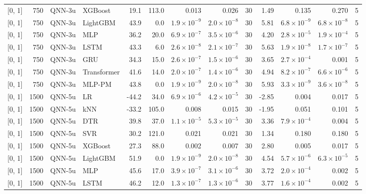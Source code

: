 \begin{longtable}{lrllrrrrrrrrr}
{[0, 1]} & 750 & QNN-3u & XGBoost & 19.1 & 113.0 & 0.013 & 0.026 & 30 & 1.49 & 0.135 & 0.270 & 5 \\
{[0, 1]} & 750 & QNN-3u & LightGBM & 43.9 & 0.0 & $1.9 \times 10^{-9}$ & $2.0 \times 10^{-8}$ & 30 & 5.81 & $6.8 \times 10^{-9}$ & $6.8 \times 10^{-8}$ & 5 \\
{[0, 1]} & 750 & QNN-3u & MLP & 36.2 & 20.0 & $6.9 \times 10^{-7}$ & $3.5 \times 10^{-6}$ & 30 & 4.20 & $2.8 \times 10^{-5}$ & $1.9 \times 10^{-4}$ & 5 \\
{[0, 1]} & 750 & QNN-3u & LSTM & 43.3 & 6.0 & $2.6 \times 10^{-8}$ & $2.1 \times 10^{-7}$ & 30 & 5.63 & $1.9 \times 10^{-8}$ & $1.7 \times 10^{-7}$ & 5 \\
{[0, 1]} & 750 & QNN-3u & GRU & 34.3 & 15.0 & $2.6 \times 10^{-7}$ & $1.5 \times 10^{-6}$ & 30 & 3.65 & $2.7 \times 10^{-4}$ & 0.001 & 5 \\
{[0, 1]} & 750 & QNN-3u & Transformer & 41.6 & 14.0 & $2.0 \times 10^{-7}$ & $1.4 \times 10^{-6}$ & 30 & 4.94 & $8.2 \times 10^{-7}$ & $6.6 \times 10^{-6}$ & 5 \\
{[0, 1]} & 750 & QNN-3u & MLP-PM & 43.8 & 0.0 & $1.9 \times 10^{-9}$ & $2.0 \times 10^{-8}$ & 30 & 5.93 & $3.3 \times 10^{-9}$ & $3.6 \times 10^{-8}$ & 5 \\
\midrule
{[0, 1]} & 1500 & QNN-5u & LR & -44.2 & 34.0 & $6.9 \times 10^{-6}$ & $4.2 \times 10^{-5}$ & 30 & -2.85 & 0.004 & 0.017 & 5 \\
{[0, 1]} & 1500 & QNN-5u & kNN & -33.2 & 105.0 & 0.008 & 0.015 & 30 & -1.95 & 0.051 & 0.101 & 5 \\
{[0, 1]} & 1500 & QNN-5u & DTR & 39.8 & 37.0 & $1.1 \times 10^{-5}$ & $5.3 \times 10^{-5}$ & 30 & 3.36 & $7.9 \times 10^{-4}$ & 0.004 & 5 \\
{[0, 1]} & 1500 & QNN-5u & SVR & 30.2 & 121.0 & 0.021 & 0.021 & 30 & 1.34 & 0.180 & 0.180 & 5 \\
{[0, 1]} & 1500 & QNN-5u & XGBoost & 27.3 & 88.0 & 0.002 & 0.007 & 30 & 2.80 & 0.005 & 0.017 & 5 \\
{[0, 1]} & 1500 & QNN-5u & LightGBM & 51.9 & 0.0 & $1.9 \times 10^{-9}$ & $2.0 \times 10^{-8}$ & 30 & 4.54 & $5.7 \times 10^{-6}$ & $6.3 \times 10^{-5}$ & 5 \\
{[0, 1]} & 1500 & QNN-5u & MLP & 45.6 & 17.0 & $3.9 \times 10^{-7}$ & $3.1 \times 10^{-6}$ & 30 & 3.72 & $2.0 \times 10^{-4}$ & 0.002 & 5 \\
{[0, 1]} & 1500 & QNN-5u & LSTM & 46.2 & 12.0 & $1.3 \times 10^{-7}$ & $1.3 \times 10^{-6}$ & 30 & 3.77 & $1.6 \times 10^{-4}$ & 0.002 & 5 \\

\end{longtable}
